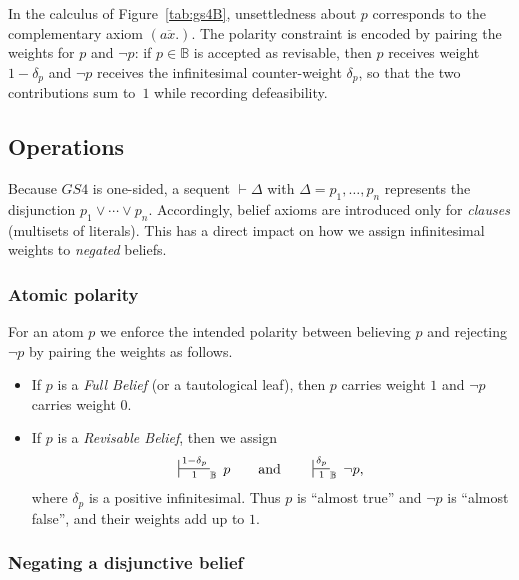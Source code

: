 \documentclass[12pt,a4paper,reqno]{amsart}
\theoremstyle{definition}
\newcommand{\numberset}{\mathbb}
\newcommand{\B}{\numberset{B}}
\begin{document}
In the calculus of Figure~\ref{tab:gs4B}, unsettledness about $p$ corresponds to the complementary axiom $(\overline{ax.})$.  The polarity constraint is encoded by pairing the weights for $p$ and $\neg p$: if $p\in\B$ is accepted as revisable, then $p$ receives weight $1-\delta_p$ and $\neg p$ receives the infinitesimal counter-weight $\delta_p$, so that the two contributions sum to~$1$ while recording defeasibility.

\subsection{Operations}
\label{sec:operations}

Because $GS4$ is one-sided, a sequent $\vdash \Delta$ with $\Delta=p_1,\dots,p_n$ represents the disjunction $p_1\vee\cdots\vee p_n$.  Accordingly, belief axioms are introduced only for \emph{clauses} (multisets of literals).  This has a direct impact on how we assign infinitesimal weights to \emph{negated} beliefs.

\subsubsection*{Atomic polarity}

For an atom $p$ we enforce the intended polarity between believing $p$ and rejecting $\neg p$ by pairing the weights as follows.

\begin{itemize}
  \item If $p$ is a \emph{Full Belief} (or a tautological leaf), then $p$ carries weight $1$ and $\neg p$ carries weight $0$.
  \item If $p$ is a \emph{Revisable Belief}, then we assign
  \[
    \sststile{1}{1-\delta_p}_\B\, p
    \qquad\text{and}\qquad
    \sststile{1}{\delta_p}_\B\, \neg p,
  \]
  where $\delta_p$ is a positive infinitesimal.  Thus $p$ is ``almost true'' and $\neg p$ is ``almost false'', and their weights add up to $1$.
\end{itemize}

\subsubsection*{Negating a disjunctive belief}
\end{document}
